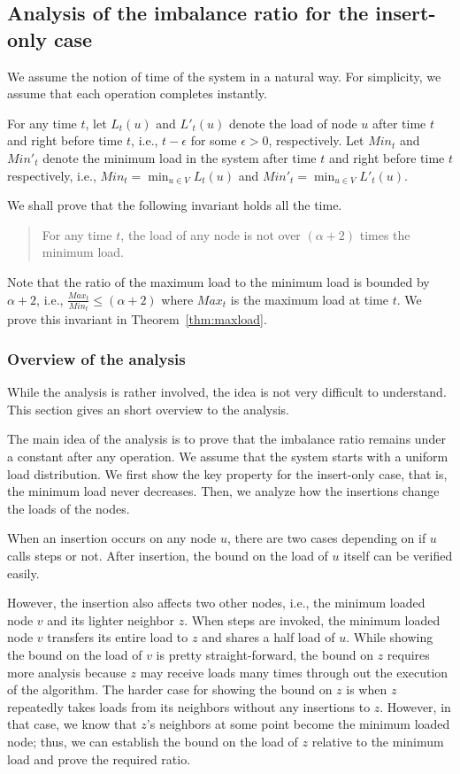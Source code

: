 \documentclass[a4paper]{article}
\begin{document}
\subsection{Analysis of the imbalance ratio for the insert-only case}

We assume the notion of time of the system in a natural way.  For
simplicity, we assume that each operation completes instantly.

For any time $t$, let $L_t(u)$ and $L'_t(u)$ denote the load of node
$u$ after time $t$ and right before time $t$, i.e., $t-\epsilon$
for some $\epsilon>0$, respectively.  Let $Min_t$ and $Min'_t$ denote
the minimum load in the system after time $t$ and right before time
$t$ respectively, i.e., $Min_t =\min_{u\in V} L_t(u)$ and $Min'_t
=\min_{u\in V} L'_t(u)$.

We shall prove that the following invariant holds all the time.
\begin{quote} {\sc For any time $t$, the load of any node is not over
    $(\alpha+2)$ times the minimum load.}
\end{quote}
Note that the ratio of the maximum load to the minimum load is bounded by
$\alpha+2$, i.e., $\frac{Max_t}{Min_t}\leq (\alpha+2)$ where $Max_t$
is the maximum load at time $t$.  We  prove this invariant in
Theorem~\ref{thm:maxload}.

\subsubsection{Overview of the analysis}

While the analysis is rather involved, the idea is not very difficult to understand.  
This section gives an short overview to the analysis.

The main idea of the analysis is to prove that the imbalance ratio
remains under a constant after any operation.  We assume that the system starts with a uniform 
load distribution.   We first show the key property for the insert-only case, that is,
the minimum load never decreases.  Then, we analyze how the insertions change the loads of the nodes.

When an insertion occurs on any node $u$, there are two cases
depending on if $u$ calls   {\minbalance} steps or not.  
After insertion, the bound on the load of $u$ itself can be verified easily.

However, the insertion also affects two other nodes, i.e., 
the minimum loaded node $v$ and its lighter neighbor $z$.
When  {\minbalance} steps are invoked, the minimum loaded 
node $v$ transfers its entire load to $z$ and shares a half load of $u$.   
While showing the bound on the load of $v$ is pretty straight-forward,
the bound on $z$ requires more analysis because $z$
may receive loads many times through out the execution of the algorithm. 
The harder case for showing the bound on $z$ is when $z$ repeatedly takes
loads from its neighbors without any insertions to $z$.  However, in that case,
we know that $z$'s neighbors at some point become the minimum loaded node;
thus, we can establish the bound on the load of $z$ relative to the minimum load and
prove the required ratio.
\end{document}
